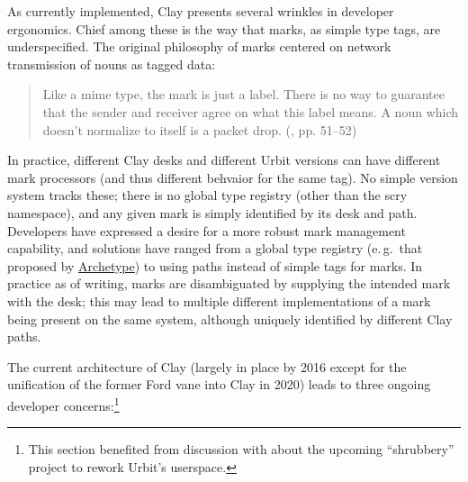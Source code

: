\documentclass[twoside]{article}
\begin{document}
As currently implemented, Clay presents several wrinkles in developer ergonomics.  Chief among these is the way that marks, as simple type tags, are underspecified.  The original philosophy of marks centered on network transmission of nouns as tagged data:

\begin{quote}
  Like a {\sc mime} type, the mark is just a label. There is no way to guarantee that the sender and receiver agree on what this label means.  A noun which doesn't normalize to itself is a packet drop.  (\citet{Whitepaper}, pp. 51–52)
\end{quote}

\noindent
In practice, different Clay desks and different Urbit versions can have different mark processors (and thus different behvaior for the same tag).  No simple version system tracks these; there is no global type registry (other than the scry namespace), and any given mark is simply identified by its desk and path.  Developers have expressed a desire for a more robust mark management capability, and solutions have ranged from a global type registry (e.\,g.\ that proposed by \href{https://www.archetype.computer/}{Archetype}) to using paths instead of simple tags for marks.  In practice as of writing, marks are disambiguated by supplying the intended mark with the desk; this may lead to multiple different implementations of a mark being present on the same system, although uniquely identified by different Clay paths.

The current architecture of Clay (largely in place by 2016 except for the unification of the former Ford vane into Clay in 2020) leads to three ongoing developer concerns:\footnote{This section benefited from discussion with  about the upcoming ``shrubbery'' project to rework Urbit's userspace.}
\end{document}
